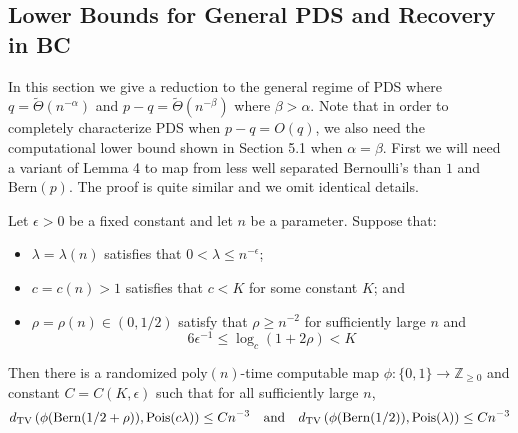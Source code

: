 \documentclass[11pt]{article}
\begin{document}
\subsection{Lower Bounds for General PDS and Recovery in BC}

In this section we give a reduction to the general regime of PDS where $q = \tilde{\Theta}(n^{-\alpha})$ and $p - q = \tilde{\Theta}(n^{-\beta})$ where $\beta > \alpha$. Note that in order to completely characterize PDS when $p - q = O(q)$, we also need the computational lower bound shown in Section 5.1 when $\alpha = \beta$. First we will need a variant of Lemma 4 to map from less well separated Bernoulli's than $1$ and $\text{Bern}(p)$. The proof is quite similar and we omit identical details.

\begin{lemma}
Let $\epsilon > 0$ be a fixed constant and let $n$ be a parameter. Suppose that:
\begin{itemize}
\item $\lambda = \lambda(n)$ satisfies that $0 < \lambda \le n^{-\epsilon}$;
\item $c = c(n) > 1$ satisfies that $c < K$ for some constant $K$; and
\item $\rho = \rho(n) \in (0, 1/2)$ satisfy that $\rho \ge n^{-2}$ for sufficiently large $n$ and
$$6\epsilon^{-1} \le \log_c (1 + 2\rho) < K$$
\end{itemize}
Then there is a randomized $\text{poly}(n)$-time computable map $\phi : \{0, 1\} \to \mathbb{Z}_{\ge 0}$ and constant $C = C(K, \epsilon)$ such that for all sufficiently large $n$,
$$d_{\text{TV}}\left(\phi(\text{Bern}(1/2 + \rho)), \text{Pois}(c\lambda) \right) \le C n^{-3} \quad \text{and} \quad d_{\text{TV}}\left(\phi(\text{Bern}(1/2)), \text{Pois}(\lambda) \right) \le Cn^{-3}$$
\end{lemma}
\end{document}
